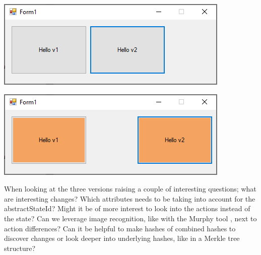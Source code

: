 \begingroup
\captionsetup{type=figure}
\includegraphics[scale=1]{pics/exp-v2.png}
\label{fig:exp-v2}
\endgroup

\begingroup
\captionsetup{type=figure}
\includegraphics[scale=1]{pics/exp-v3.png}
\label{fig:exp-v3}
\endgroup

When looking at the three versions raising a couple of interesting questions; what are interesting changes? Which attributes needs to be taking into account for the abstractStateId? Might it be of more interest to look into the actions instead of the state? Can we leverage image recognition, like with the Murphy tool \cite{murphy-extract-gui}, next to action differences? Can it be helpful to make hashes of combined hashes to discover changes or look deeper into underlying hashes, like in a Merkle tree \cite{merkle-tree} structure?
